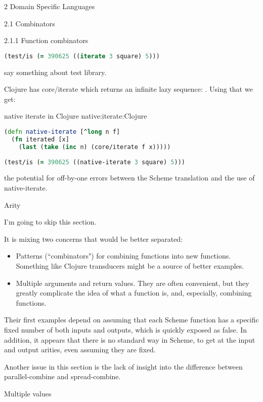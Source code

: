 \documentclass[12pt]{PalisadesLakesBook}
\begin{document}
\begin{plSection}{2 Domain Specific Languages}
\begin{plSection}{2.1 Combinators}
\begin{plSection}{2.1.1 Function combinators}
\begin{plListing}
\begin{lstlisting}[language=clojure]
(test/is (= 390625 ((iterate 3 square) 5)))
\end{lstlisting}
\end{plListing}
\TODO say something about {\clojureFont test} library.

Clojure has {\clojureFont core/iterate} 
which returns an infinite lazy sequence:
{\clojureFont [(f x) (f (f x)) \ldots]}.
Using that we get:
\begin{plListing}
{native {\clojureFont iterate} in Clojure}
{native:iterate:Clojure}
\begin{lstlisting}[language=clojure]
(defn native-iterate [^long n f]
  (fn iterated [x] 
    (last (take (inc n) (core/iterate f x)))))
    
(test/is (= 390625 ((native-iterate 3 square) 5)))
\end{lstlisting}
\end{plListing}
\NOTE the potential for off-by-one errors between the Scheme
translation and the use of {\clojureFont native-iterate}.

\begin{plSection}{Arity}

I'm going to skip this section.

It is mixing two concerns that would be better separated:
\begin{itemize}
  \item Patterns (``combinators")
  for combining functions into new functions.
  Something like Clojure transducers might be a source of 
  better examples.
  \item Multiple arguments and return values. 
  They are often convenient, but they greatly complicate 
  the idea of what a function is, and, especially,
  combining functions.
  
\end{itemize}
Their first examples depend on assuming that each Scheme function
has a specific fixed number of both inputs and outputs, 
which is quickly exposed as false. 
In addition, it appears that there is no standard way 
in Scheme,
to get at the input and output arities, even assuming they are 
fixed.

Another issue in this section is the lack of insight
into the difference between {\schemeFont parallel-combine}
and {\schemeFont spread-combine}. 

\end{plSection}%
\begin{plSection}{Multiple values}\label{Multiple:values}


\end{plSection}
\end{plSection}
\end{plSection}
\end{plSection}
\end{document}
